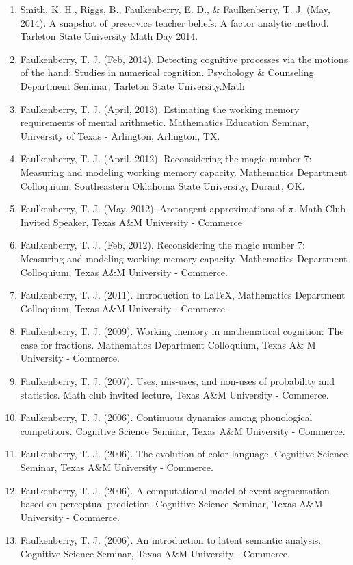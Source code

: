 \documentclass[article,10pt]{article}
\begin{document}
\begin{enumerate}
\item Smith, K. H., Riggs, B., Faulkenberry, E. D., \& Faulkenberry, T. J. (May, 2014). A snapshot of preservice teacher beliefs: A factor analytic method. Tarleton State University Math Day 2014.
\item Faulkenberry, T. J. (Feb, 2014). Detecting cognitive processes via the motions of the hand: Studies in numerical cognition.  Psychology \& Counseling Department Seminar, Tarleton State University.Math
\item Faulkenberry, T. J. (April, 2013). Estimating the working memory requirements of mental arithmetic. Mathematics Education Seminar, University of Texas - Arlington, Arlington, TX.
\item Faulkenberry, T. J. (April, 2012). Reconsidering the magic number 7: Measuring and modeling working memory capacity. Mathematics Department Colloquium, Southeastern Oklahoma State University, Durant, OK.
\item Faulkenberry, T. J. (May, 2012). Arctangent approximations of \(\pi\). Math Club Invited Speaker, Texas A\&M University - Commerce
\item Faulkenberry, T. J. (Feb, 2012). Reconsidering the magic number 7: Measuring and modeling working memory capacity. Mathematics Department Colloquium, Texas A\&M University - Commerce.
\item Faulkenberry, T. J. (2011). Introduction to \LaTeX{}, Mathematics Department Colloquium, Texas A\&M University - Commerce
\item Faulkenberry, T. J. (2009). Working memory in mathematical cognition: The case for fractions. Mathematics Department Colloquium, Texas A\& M University - Commerce.
\item Faulkenberry, T. J. (2007). Uses, mis-uses, and non-uses of probability and statistics. Math club invited lecture, Texas A\&M University - Commerce.
\item Faulkenberry, T. J. (2006). Continuous dynamics among phonological competitors. Cognitive Science Seminar, Texas A\&M University - Commerce.
\item Faulkenberry, T. J. (2006). The evolution of color language. Cognitive Science Seminar, Texas A\&M University - Commerce.
\item Faulkenberry, T. J. (2006). A computational model of event segmentation based on perceptual prediction. Cognitive Science Seminar, Texas A\&M University - Commerce.
\item Faulkenberry, T. J. (2006). An introduction to latent semantic analysis. Cognitive Science Seminar, Texas A\&M University - Commerce.

\end{enumerate}
\end{document}
